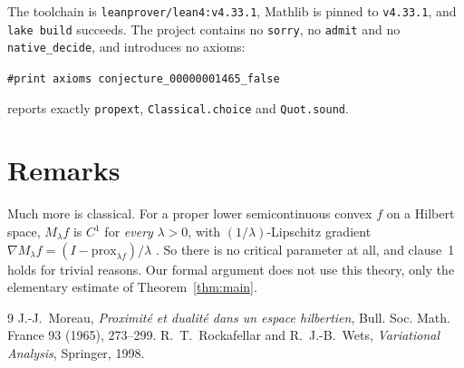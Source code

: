 \documentclass[11pt]{article}
\theoremstyle{plain}
\theoremstyle{definition}
\theoremstyle{remark}
\begin{document}
The toolchain is \texttt{leanprover/lean4:v4.33.1}, Mathlib is pinned to
\texttt{v4.33.1}, and \texttt{lake build} succeeds. The project contains no
\texttt{sorry}, no \texttt{admit} and no \texttt{native\_decide}, and
introduces no axioms:
\begin{center}
\texttt{\#print axioms conjecture\_00000001465\_false}
\end{center}
reports exactly \texttt{propext}, \texttt{Classical.choice} and
\texttt{Quot.sound}.

\section{Remarks}

Much more is classical. For a proper lower semicontinuous convex $f$ on a
Hilbert space, $M_\lambda f$ is $C^1$ for \emph{every} $\lambda>0$, with
$(1/\lambda)$-Lipschitz gradient $\nabla M_\lambda f=(I-\mathrm{prox}_{\lambda
f})/\lambda$ \cite{moreau,rw}. So there is no critical parameter at all, and
clause~1 holds for trivial reasons. Our formal argument does not use this
theory, only the elementary estimate of Theorem~\ref{thm:main}.

\begin{thebibliography}{9}
 J.-J.~Moreau, \emph{Proximit\'e et dualit\'e dans un espace
  hilbertien}, Bull. Soc. Math. France 93 (1965), 273--299.
 R.~T.~Rockafellar and R.~J.-B.~Wets, \emph{Variational Analysis},
  Springer, 1998.
\end{thebibliography}
\end{document}

